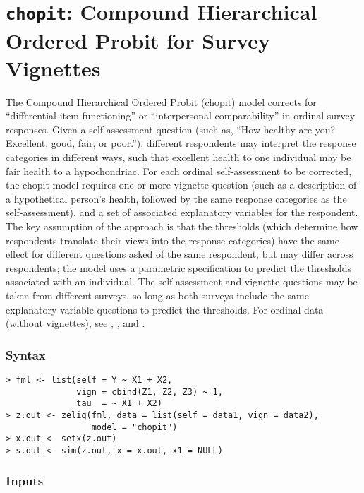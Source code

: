 \section{{\tt chopit}: Compound Hierarchical Ordered Probit for Survey
Vignettes}
\label{chopit}

The Compound Hierarchical Ordered Probit ({\sc chopit}) model corrects
for ``differential item functioning'' or ``interpersonal
comparability'' in ordinal survey responses.  Given a self-assessment
question (such as, ``How healthy are you?  Excellent, good, fair, or
poor.''), different respondents may interpret the response categories
in different ways, such that excellent health to one individual may be
fair health to a hypochondriac.  For each ordinal self-assessment to be
corrected, the {\sc chopit} model requires one or more vignette
question (such as a description of a hypothetical person's health,
followed by the same response categories as the self-assessment), and
a set of associated explanatory variables for the respondent.  The key
assumption of the approach is that the thresholds (which determine how
respondents translate their views into the response categories) have
the same effect for different questions asked of the same respondent,
but may differ across respondents; the model uses
a parametric specification to predict the thresholds associated with an
individual.  The self-assessment and vignette questions may be taken
from different surveys, so long as both surveys include the same
explanatory variable questions to predict the thresholds.  For ordinal
data (without vignettes), see , , and
.  

\subsubsection{Syntax}

\begin{verbatim}
> fml <- list(self = Y ~ X1 + X2, 
              vign = cbind(Z1, Z2, Z3) ~ 1, 
              tau  = ~ X1 + X2)
> z.out <- zelig(fml, data = list(self = data1, vign = data2), 
                 model = "chopit")
> x.out <- setx(z.out)
> s.out <- sim(z.out, x = x.out, x1 = NULL)
\end{verbatim}

\subsubsection{Inputs}

